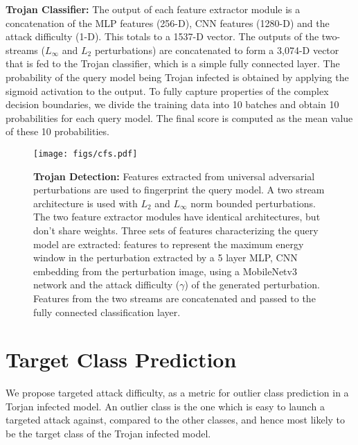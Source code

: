 \documentclass{article}
\begin{document}
\textbf{Trojan Classifier:} The output of each feature extractor module is a concatenation of the MLP features (256-D), CNN features (1280-D) and the attack difficulty (1-D). This totals to a 1537-D vector. The outputs of the two-streams ($L_\infty$ and $L_2$ perturbations) are concatenated to form a 3,074-D vector that is fed to the Trojan classifier, which is a simple fully connected layer. The probability of  the query model being  Trojan infected is obtained by applying the sigmoid activation to the output. To fully capture properties of the complex decision boundaries, we divide the training data into 10 batches and obtain 10 probabilities for each query model. The final score is computed as the mean value of these 10 probabilities. 



\begin{figure}[t]
\centering
\texttt{[image: figs/cfs.pdf]}
\vspace{-12mm}
\caption{\textbf{Trojan Detection:} Features extracted from universal adversarial perturbations are used to fingerprint the query model. A two stream architecture is used with $L_2$ and $L_\infty$ norm bounded perturbations. The two feature extractor modules have identical architectures, but don't share weights. Three sets of features characterizing the query model are extracted: features to represent the maximum energy window in the perturbation extracted by a 5 layer MLP, CNN embedding from the perturbation image, using a MobileNetv3 network and the attack difficulty ($\gamma$) of the generated perturbation. Features from the two streams are concatenated and passed to the fully connected classification layer.}
\label{fig:system}
\vspace{-4mm}
\end{figure}


\vspace{-4mm}
\section{Target Class Prediction}
\vspace{-4mm}





We propose targeted attack difficulty, as a metric for outlier class prediction in a Torjan infected model. An outlier class is the one which is easy to launch a targeted attack against, compared to the other classes, and hence most likely to be the target class of the Trojan infected model. 
\end{document}
